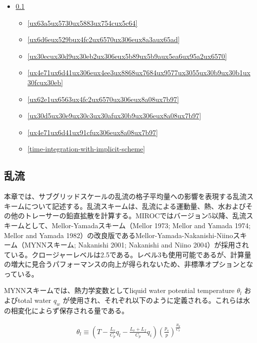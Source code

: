 \begin{itemize}
\tightlist
\item
  \ref{ux4e71ux6d41}

  \begin{itemize}
  \tightlist
  \item
    \ref{ux63a5ux5730ux5883ux754cux5c64}
  \item
    \ref{ux6d6eux529bux4fc2ux6570ux306eux8a3aux65ad}
  \item
    \ref{ux30ecux30d9ux30eb2ux306eux5b89ux5b9aux5ea6ux95a2ux6570}
  \item
    \ref{ux4e71ux6d41ux306eux4ee3ux8868ux7684ux9577ux3055ux30b9ux30b1ux30fcux30eb}
  \item
    \ref{ux62e1ux6563ux4fc2ux6570ux306eux8a08ux7b97}
  \item
    \ref{ux30d5ux30e9ux30c3ux30afux30b9ux306eux8a08ux7b97}
  \item
    \ref{ux4e71ux6d41ux91cfux306eux8a08ux7b97}
  \item
    \ref{time-integration-with-implicit-scheme}
  \end{itemize}
\end{itemize}

\hypertarget{ux4e71ux6d41}{%
\subsection{乱流}\label{ux4e71ux6d41}}

本章では、サブグリッドスケールの乱流の格子平均量への影響を表現する乱流スキームについて記述する。乱流スキームは、乱流による運動量、熱、水およびその他のトレーサーの鉛直拡散を計算する。MIROCではバージョン5以降、乱流スキームとして、Mellor-Yamadaスキーム（Mellor
1973; Mellor and Yamada 1974; Mellor and Yamada 1982）の改良版であるMellor-Yamada-Nakanishi-Niinoスキーム（MYNNスキーム; Nakanishi 2001; Nakanishi and Niino
2004）が採用されている。クロージャーレベルは2.5である。レベル3も使用可能であるが、計算量の増大に見合うパフォーマンスの向上が得られないため、非標準オプションとなっている。

MYNNスキームでは、熱力学変数としてliquid water potential temperature \(\theta_l\) およびtotal water \(q_w\) が使用され、それぞれ以下のように定義される。これらは水の相変化によらず保存される量である。

\begin{eqnarray} \theta_l \equiv \left(T - \frac{L_v}{C_p}q_l - \frac{L_v+L_f}{C_p}q_i \right) \left(\frac{p_s}{p}\right)^{\frac{R_d}{C_p}} \end{eqnarray}

